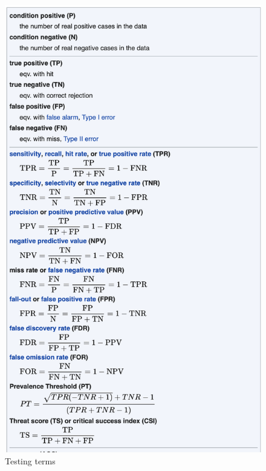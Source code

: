 \documentclass[
  ignorenonframetext,
]{beamer}
\renewcommand{\,}{\text{, }}
\begin{document}
\begin{frame}
\begin{figure}
\centering
\includegraphics{../images/wiki-sensitivity.png}
\caption{Testing terms}
\end{figure}
\end{frame}
\end{document}
